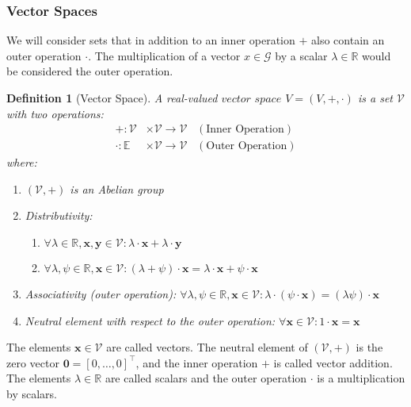 \documentclass{article}
\newtheorem{definition}{Definition}[section]
\begin{document}
 	\subsubsection{Vector Spaces}
 	We will consider sets that in addition to an inner operation $+$ also contain an outer operation $\cdot$. The multiplication of a vector $x \in \mathcal{G}$ by a scalar $\lambda \in \mathbb{R}$ would be considered the outer operation. 
 	\begin{definition}[Vector Space]
 		\normalfont A real-valued $\textit{vector space}$ $V = (V, +, \cdot)$ is a set $\mathcal{V}$ with two operations:
 		\begin{align}
 			+: \mathcal{V} &\times \mathcal{V} \rightarrow \mathcal{V} \hspace{10pt} (\text{Inner Operation}) \\
 			\cdot: \mathbb{E} &\times \mathcal{V} \rightarrow \mathcal{V} \hspace{10pt} (\text{Outer Operation})
 		\end{align}
 		where:
 		\begin{enumerate}
 			\item $(\mathcal{V}, +)$ is an Abelian group
 			\item Distributivity: 
 			\begin{enumerate}
 				\item $\forall \lambda \in \mathbb{R}, \textbf{x}, \textbf{y} \in \mathcal{V}: \lambda \cdot \textbf{x} + \lambda \cdot \textbf{y}$
 				\item $\forall \lambda, \psi \in \mathbb{R}, \textbf{x} \in \mathcal{V}: (\lambda + \psi) \cdot \textbf{x} = \lambda \cdot \textbf{x} + \psi \cdot \textbf{x}$
 			\end{enumerate} 
 			\item Associativity (outer operation): $\forall\lambda, \psi \in \mathbb{R}, \textbf{x} \in \mathcal{V}: \lambda \cdot (\psi \cdot \textbf{x}) = (\lambda\psi)\cdot\textbf{x}$
 			\item Neutral element with respect to the outer operation: $\forall \textbf{x} \in \mathcal{V}: 1 \cdot \textbf{x} = \textbf{x}$
 		\end{enumerate}
 	\end{definition}
	The elements $\textbf{x} \in \mathcal{V}$ are called vectors. The neutral element of $(\mathcal{V}, +)$ is the zero vector $\textbf{0} = [0, \ldots, 0]^{\top}$, and the inner operation $+$ is called vector addition. The elements $\lambda \in \mathbb{R}$ are called scalars and the outer operation $\cdot$ is a multiplication by scalars. 
\end{document}
